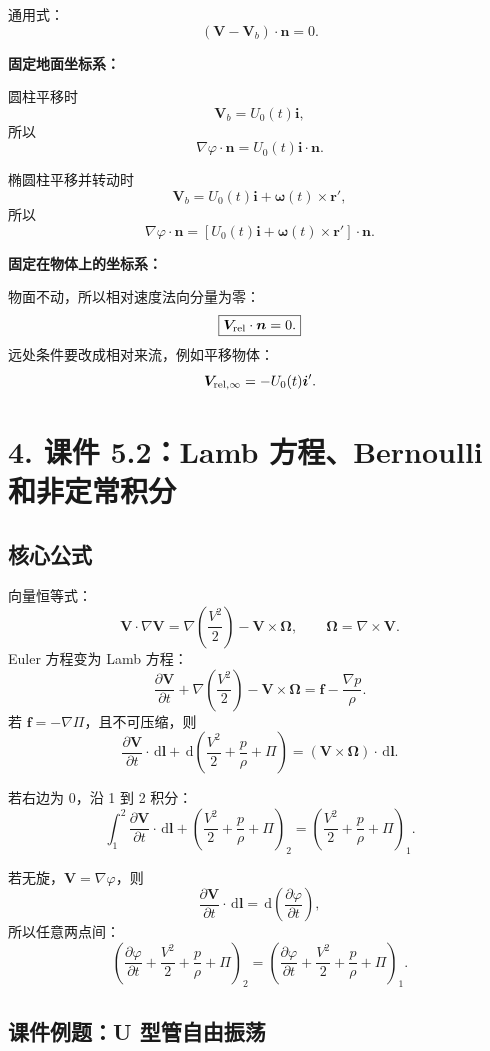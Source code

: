 \documentclass[UTF8,zihao=-4]{ctexart}
\newcommand{\dd}{\,\mathrm d}
\begin{document}
通用式：
\[
\boxed{(\bm V-\bm V_b)\cdot\bm n=0.}
\]

\textbf{固定地面坐标系：}

圆柱平移时
\[
\bm V_b=U_0(t)\bm i,
\]
所以
\[
\boxed{\nabla\varphi\cdot\bm n=U_0(t)\bm i\cdot\bm n.}
\]

椭圆柱平移并转动时
\[
\bm V_b=U_0(t)\bm i+\bm\omega(t)\times\bm r',
\]
所以
\[
\boxed{
\nabla\varphi\cdot\bm n
=\left[U_0(t)\bm i+\bm\omega(t)\times\bm r'\right]\cdot\bm n.}
\]

\textbf{固定在物体上的坐标系：}

物面不动，所以相对速度法向分量为零：
\[
\boxed{\bm V_{\rm rel}\cdot\bm n=0.}
\]
远处条件要改成相对来流，例如平移物体：
\[
\bm V_{\rm rel,\infty}=-U_0(t)\bm i'.
\]

\section*{4. 课件 5.2：Lamb 方程、Bernoulli 和非定常积分}

\subsection*{核心公式}

向量恒等式：
\[
\bm V\cdot\nabla\bm V
=\nabla\left(\frac{V^2}{2}\right)-\bm V\times\bm\Omega,
\qquad \bm\Omega=\nabla\times\bm V.
\]
Euler 方程变为 Lamb 方程：
\[
\boxed{
\frac{\partial\bm V}{\partial t}
+\nabla\left(\frac{V^2}{2}\right)
-\bm V\times\bm\Omega
=\bm f-\frac{\nabla p}{\rho}.}
\]
若 \(\bm f=-\nabla\Pi\)，且不可压缩，则
\[
\frac{\partial\bm V}{\partial t}\cdot\dd\bm l
+\dd\left(\frac{V^2}{2}+\frac p\rho+\Pi\right)
=(\bm V\times\bm\Omega)\cdot\dd\bm l.
\]

若右边为 0，沿 1 到 2 积分：
\[
\boxed{
\int_1^2\frac{\partial\bm V}{\partial t}\cdot\dd\bm l
+\left(\frac{V^2}{2}+\frac p\rho+\Pi\right)_2
=
\left(\frac{V^2}{2}+\frac p\rho+\Pi\right)_1.}
\]

若无旋，\(\bm V=\nabla\varphi\)，则
\[
\frac{\partial\bm V}{\partial t}\cdot\dd\bm l
=\dd\left(\frac{\partial\varphi}{\partial t}\right),
\]
所以任意两点间：
\[
\boxed{
\left(\frac{\partial\varphi}{\partial t}
+\frac{V^2}{2}+\frac p\rho+\Pi\right)_2
=
\left(\frac{\partial\varphi}{\partial t}
+\frac{V^2}{2}+\frac p\rho+\Pi\right)_1.}
\]

\subsection*{课件例题：U 型管自由振荡}
\end{document}
